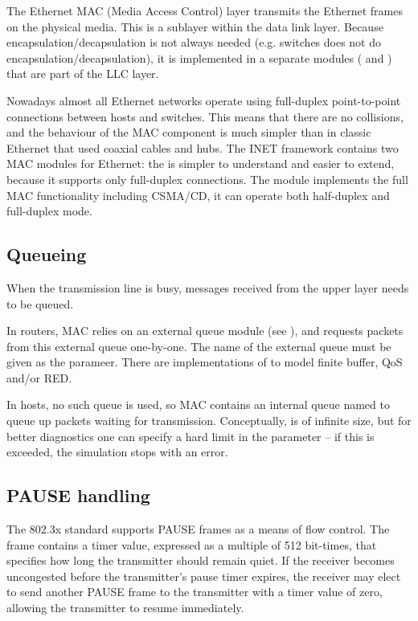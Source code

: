The Ethernet MAC (Media Access Control) layer transmits the Ethernet frames on
the physical media. This is a sublayer within the data link layer. Because
encapsulation/decapsulation is not always needed (e.g. switches does not do
encapsulation/decapsulation), it is implemented in a separate modules
( and ) that are part of the LLC layer.


Nowadays almost all Ethernet networks operate using full-duplex
point-to-point connections between hosts and switches. This means
that there are no collisions, and the behaviour of the MAC component
is much simpler than in classic Ethernet that used coaxial cables and
hubs. The INET framework contains two MAC modules for Ethernet:
the  is simpler to understand and easier to extend,
because it supports only full-duplex connections. The 
module implements the full MAC functionality including CSMA/CD, it
can operate both half-duplex and full-duplex mode.

\subsection*{Queueing}

When the transmission line is busy, messages received from the upper layer
needs to be queued.

In routers, MAC relies on an external queue module (see ),
and requests packets from this external queue one-by-one. The name of the
external queue must be given as the  parameer.
There are implementations of  to model finite buffer,
QoS and/or RED.

In hosts, no such queue is used, so MAC contains an internal
queue named  to queue up packets waiting for transmission.
Conceptually,  is of infinite size, but for better diagnostics
one can specify a hard limit in the  parameter -- if this is
exceeded, the simulation stops with an error.

\subsection*{PAUSE handling}
\label{subsec:pause_handling}

The 802.3x standard supports PAUSE frames as a means of flow
control. The frame contains a timer value, expressed as a multiple
of 512 bit-times, that specifies how long the transmitter should
remain quiet. If the receiver becomes uncongested before the
transmitter's pause timer expires, the receiver may elect to send
another PAUSE frame to the transmitter with a timer value of zero,
allowing the transmitter to resume immediately.

